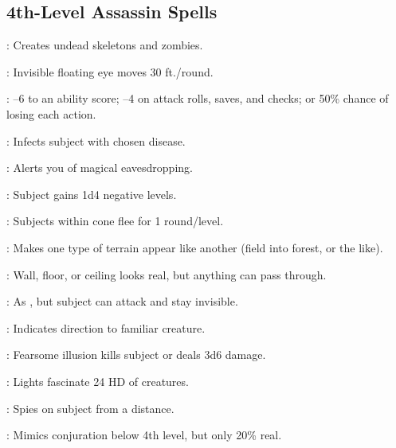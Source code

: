 \begin{multicols}{2}
\subsection{4th-Level Assassin Spells}
\begin{description*}
\item[\linkspell{Animate Dead}:] Creates undead skeletons and zombies.
\item[\linkspell{Arcane Eye}:] Invisible floating eye moves 30 ft./round.
\item[\linkspell{Bestow Curse}:] –6 to an ability score; –4 on attack rolls, saves, and checks; or 50\% chance of losing each action.
\item[\linkspell{Contagion}:] Infects subject with chosen disease.
\item[\linkspell{Detect Scrying}:] Alerts you of magical eavesdropping.
\item[\linkspell{Enervation}:] Subject gains 1d4 negative levels.
\item[\linkspell{Fear}:] Subjects within cone flee for 1 round/level.
\item[\linkspell{Hallucinatory Terrain}:] Makes one type of terrain appear like another (field into forest, or the like).
\item[\linkspell{Illusory Wall}:] Wall, floor, or ceiling looks real, but anything can pass through.
\item[\linkspell{Invisibility, Greater}:] As , but subject can attack and stay invisible.
\item[\linkspell{Locate Creature}:] Indicates direction to familiar creature.
\item[\linkspell{Phantasmal Killer}:] Fearsome illusion kills subject or deals 3d6 damage.
\item[\linkspell{Rainbow Pattern}:] Lights fascinate 24 HD of creatures.
\item[\linkspell{Scrying}:] Spies on subject from a distance.
\item[\linkspell{Shadow Conjuration}:] Mimics conjuration below 4th level, but only 20\% real.
\end{description*}


\end{multicols}
